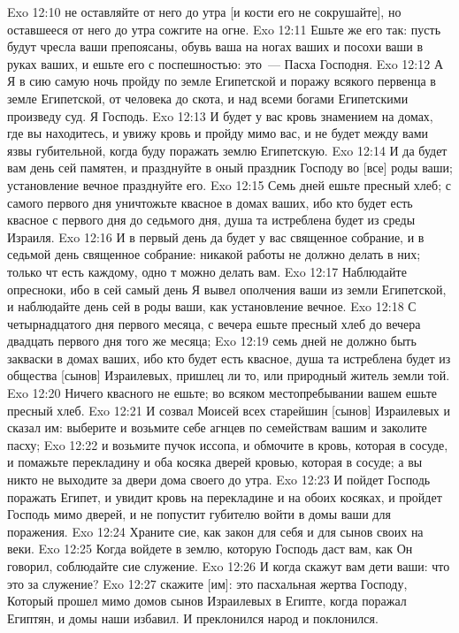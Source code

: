 \vs Exo 12:10 не оставляйте от него до утра [и кости его не сокрушайте], но оставшееся от него до утра сожгите на огне.
\vs Exo 12:11 Ешьте же его так: пусть будут чресла ваши препоясаны, обувь ваша на ногах ваших и посохи ваши в руках ваших, и ешьте его с поспешностью: это~--- Пасха Господня.
\vs Exo 12:12 А Я в сию самую ночь пройду по земле Египетской и поражу всякого первенца в земле Египетской, от человека до скота, и над всеми богами Египетскими произведу суд. Я Господь.
\vs Exo 12:13 И будет у вас кровь знамением на домах, где вы находитесь, и увижу кровь и пройду мимо вас, и не будет между вами язвы губительной, когда буду поражать землю Египетскую.
\vs Exo 12:14 И да будет вам день сей памятен, и празднуйте в оный праздник Господу во [все] роды ваши;  установление вечное празднуйте его.
\vs Exo 12:15 Семь дней ешьте пресный хлеб; с самого первого дня уничтожьте квасное в домах ваших, ибо кто будет есть квасное с первого дня до седьмого дня, душа та истреблена будет из среды Израиля.
\vs Exo 12:16 И в первый день да будет у вас священное собрание, и в седьмой день священное собрание: никакой работы не должно делать в них; только чт есть каждому, одно т можно делать вам.
\vs Exo 12:17 Наблюдайте опресноки, ибо в сей самый день Я вывел ополчения ваши из земли Египетской, и наблюдайте день сей в роды ваши, как установление вечное.
\vs Exo 12:18 С четырнадцатого дня первого месяца, с вечера ешьте пресный хлеб до вечера двадцать первого дня того же месяца;
\vs Exo 12:19 семь дней не должно быть закваски в домах ваших, ибо кто будет есть квасное, душа та истреблена будет из общества [сынов] Израилевых, пришлец ли то, или природный житель земли той.
\vs Exo 12:20 Ничего квасного не ешьте; во всяком местопребывании вашем ешьте пресный хлеб.
\rsbpar\vs Exo 12:21 И созвал Моисей всех старейшин [сынов] Израилевых и сказал им: выберите и возьмите себе агнцев по семействам вашим и заколите пасху;
\vs Exo 12:22 и возьмите пучок иссопа, и обмочите в кровь, которая в сосуде, и помажьте перекладину и оба косяка дверей кровью, которая в сосуде; а вы никто не выходите за двери дома своего до утра.
\vs Exo 12:23 И пойдет Господь поражать Египет, и увидит кровь на перекладине и на обоих косяках, и пройдет Господь мимо дверей, и не попустит губителю войти в домы ваши для поражения.
\vs Exo 12:24 Храните сие, как закон для себя и для сынов своих на веки.
\vs Exo 12:25 Когда войдете в землю, которую Господь даст вам, как Он говорил, соблюдайте сие служение.
\vs Exo 12:26 И когда скажут вам дети ваши: что это за служение?
\vs Exo 12:27 скажите [им]: это пасхальная жертва Господу, Который прошел мимо домов сынов Израилевых в Египте, когда поражал Египтян, и домы наши избавил. И преклонился народ и поклонился.
